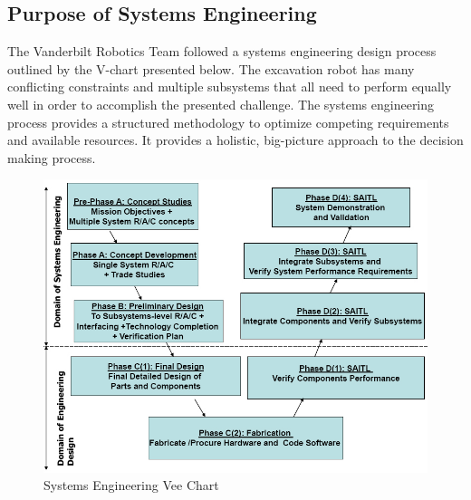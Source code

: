 \documentclass[class=article, crop=false]{standalone}
\begin{document}
	\subsection{Purpose of Systems Engineering}
	\label{subsec:systems_engineering_purpose}
	The Vanderbilt Robotics Team followed a systems engineering design process outlined by the V-chart presented below. The excavation robot has many conflicting constraints and multiple subsystems that all need to perform equally well in order to accomplish the presented challenge. The systems engineering process provides a structured methodology to optimize competing requirements and available resources. It provides a holistic, big-picture approach to the decision making process. 
	
	\FloatBarrier
		\begin{figure}[h]
			\centering
			\includegraphics[width=.50\linewidth]{09_Figures/systems_engineering_vee_chart.jpg}
			\caption{Systems Engineering Vee Chart \cite{syseng}}
			\label{fig:safety_protocol_flowsheet}
		\end{figure}
		\FloatBarrier


	
\end{document}
